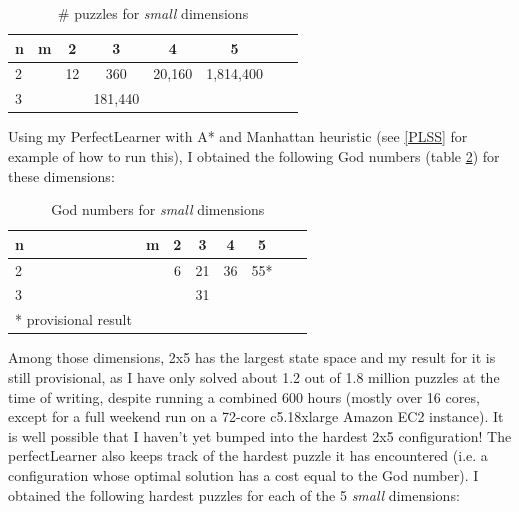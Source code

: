 \begin{table}[H]
\begin{center}
\begin{tabular}{l*{6}{c}r}
n              & m & 2 & 3 & 4 & 5\\
\hline
2              &   & 12 & 360 & 20,160 & 1,814,400 \\
3              &   &   & 181,440 &  &    \\
\end{tabular}
\caption{\label{tab:smallSP}\# puzzles for \textit{small} dimensions}
\end{center}
\end{table}
\noindent Using my PerfectLearner with A* and Manhattan heuristic (see \ref{PLSS} for example of how to run this), I obtained the following God numbers (table \ref{tab:smallSPGN}) for these dimensions:
\begin{table}[H]
\begin{center}
\begin{tabular}{l*{6}{c}r}
n              & m & 2 & 3 & 4 & 5\\
\hline
2              &   & 6 & 21 & 36 & 55* \\
3              &   &   & 31 &  &    \\
* \tiny{provisional result}
\end{tabular}
\caption{\label{tab:smallSPGN}God numbers for \textit{small} dimensions}
\end{center}
\end{table}
\noindent Among those dimensions, 2x5 has the largest state space and my result for it is still provisional, as I have only solved about 1.2 out of 1.8 million puzzles at the time of writing, despite running a combined 600 hours (mostly over 16 cores, except for a full weekend run on a 72-core c5.18xlarge Amazon EC2 instance). It is well possible that I haven't yet bumped into the hardest 2x5 configuration! The perfectLearner also keeps track of the hardest puzzle it has encountered (i.e. a configuration whose optimal solution has a cost equal to the God number). I obtained the following hardest puzzles for each of the 5 \textit{small} dimensions:
\\
\begin{three}
\centering
{}
\end{three}
\begin{five}
\end{five}
\begin{seven}
\end{seven}
\begin{nine}
\end{nine}
\begin{eight}
\end{eight}


